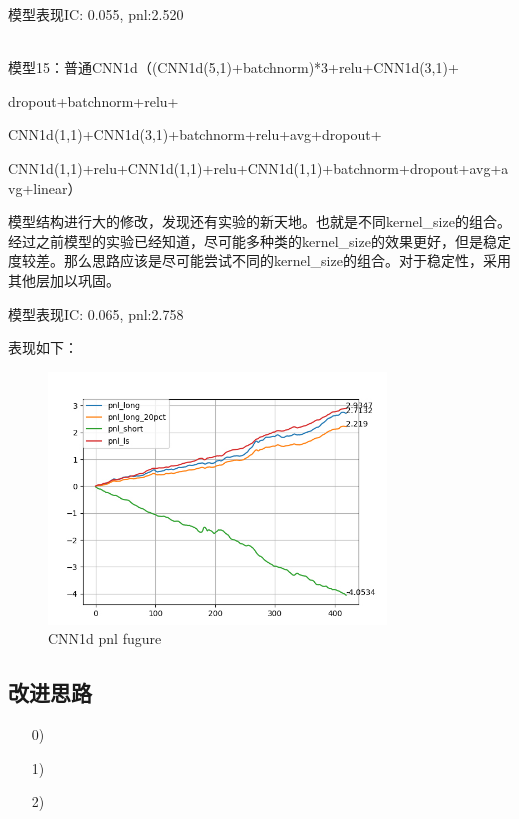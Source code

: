 \documentclass[11pt]{ctexart}
\begin{document}
模型表现{\kaishu \small IC: 0.055, pnl:2.520}

~\\
模型15：普通CNN1d（(CNN1d(5,1)+batchnorm)*3+relu+CNN1d(3,1)+

dropout+batchnorm+relu+

CNN1d(1,1)+CNN1d(3,1)+batchnorm+relu+avg+dropout+

CNN1d(1,1)+relu+CNN1d(1,1)+relu+CNN1d(1,1)+batchnorm+dropout+avg+avg+linear）

模型结构进行大的修改，发现还有实验的新天地。也就是不同kernel\_size的组合。经过之前模型的实验已经知道，尽可能多种类的kernel\_size的效果更好，但是稳定度较差。那么思路应该是尽可能尝试不同的kernel\_size的组合。对于稳定性，采用其他层加以巩固。

模型表现{\kaishu \small IC: 0.065, pnl:2.758}

表现如下：
\begin{figure}[H]

\begin{center}
\includegraphics[width=0.8\textwidth]{1.PNG}
\end{center}
\caption{CNN1d pnl fugure}
\label{FIG.2}
\end{figure}

\subsection{改进思路}
\begin{itemize}
  \item [0)]

  \item [1)]

  \item [2)]

\end{itemize}
\end{document}
